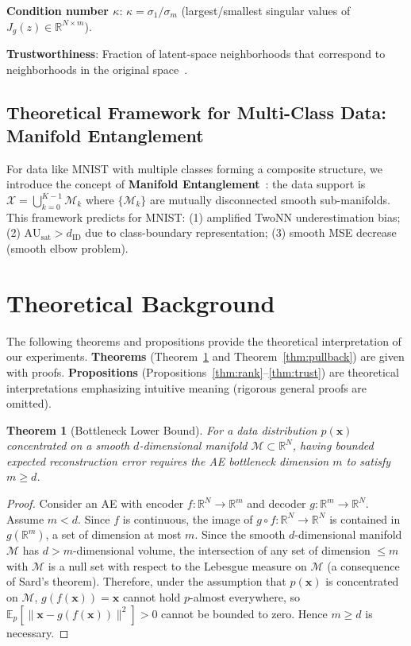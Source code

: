 \documentclass[12pt,a4paper]{article}
\newtheorem{theorem}{Theorem}
\newcommand{\dID}{d_{\mathrm{ID}}}
\newcommand{\Jg}{J_g}
\newcommand{\R}{\mathbb{R}}
\newcommand{\kap}{\kappa}
\newcommand{\AUsat}{\mathrm{AU}_{\mathrm{sat}}}
\begin{document}
\textbf{Condition number $\kap$}: $\kap = \sigma_1/\sigma_m$ (largest/smallest singular values of $\Jg(z) \in \R^{N\times m}$).

\textbf{Trustworthiness}: Fraction of latent-space neighborhoods that correspond to neighborhoods in the original space~\cite{pope2021intrinsic}.

\subsection{Theoretical Framework for Multi-Class Data: Manifold Entanglement}\label{sec:manifold_entanglement}

For data like MNIST with multiple classes forming a composite structure, we introduce the concept of \textbf{Manifold Entanglement}~\cite{carlsson2009topology}: the data support is $\mathcal{X} = \bigcup_{k=0}^{K-1} \mathcal{M}_k$ where $\{\mathcal{M}_k\}$ are mutually disconnected smooth sub-manifolds.
This framework predicts for MNIST: (1) amplified TwoNN underestimation bias; (2) $\AUsat > \dID$ due to class-boundary representation; (3) smooth MSE decrease (smooth elbow problem).

\section{Theoretical Background}\label{sec:theory}

The following theorems and propositions provide the theoretical interpretation of our experiments.
\textbf{Theorems} (Theorem~\ref{thm:lower_bound} and Theorem~\ref{thm:pullback}) are given with proofs.
\textbf{Propositions} (Propositions~\ref{thm:rank}--\ref{thm:trust}) are theoretical interpretations emphasizing intuitive meaning (rigorous general proofs are omitted).

\begin{theorem}[Bottleneck Lower Bound]\label{thm:lower_bound}
For a data distribution $p(\boldsymbol{x})$ concentrated on a smooth $d$-dimensional manifold $\mathcal{M} \subset \R^N$, having bounded expected reconstruction error requires the AE bottleneck dimension $m$ to satisfy $m \geq d$.
\end{theorem}
\begin{proof}
Consider an AE with encoder $f: \R^N \to \R^m$ and decoder $g: \R^m \to \R^N$.
Assume $m < d$.
Since $f$ is continuous, the image of $g \circ f: \R^N \to \R^N$ is contained in $g(\R^m)$, a set of dimension at most $m$.
Since the smooth $d$-dimensional manifold $\mathcal{M}$ has $d > m$-dimensional volume, the intersection of any set of dimension $\leq m$ with $\mathcal{M}$ is a null set with respect to the Lebesgue measure on $\mathcal{M}$ (a consequence of Sard's theorem).
Therefore, under the assumption that $p(\boldsymbol{x})$ is concentrated on $\mathcal{M}$,
$g(f(\boldsymbol{x})) = \boldsymbol{x}$ cannot hold $p$-almost everywhere,
so $\mathbb{E}_{p}[\|\boldsymbol{x} - g(f(\boldsymbol{x}))\|^2] > 0$ cannot be bounded to zero.
Hence $m \geq d$ is necessary.
\end{proof}
\end{document}
